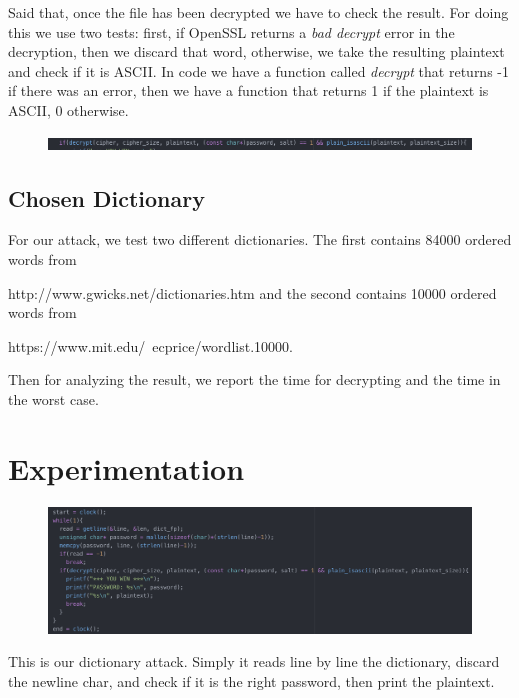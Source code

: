 \documentclass[11pt]{article}
\begin{document}
Said that, once the file has been decrypted we have to check the result. For doing this we use two tests: first, if OpenSSL returns a {\em bad decrypt} error in the decryption, then we discard that word, otherwise, we take the resulting plaintext and check if it is ASCII. In code we have a function called {\em decrypt} that returns -1 if there was an error, then we have a function that returns 1 if the plaintext is ASCII, 0 otherwise.

\begin{figure}[!ht]
 \includegraphics[width=1\textwidth]{pic3-hw2-1635747}
 \label{fig:Ascii check}
\end{figure}

\subsection{Chosen Dictionary}
For our attack, we test two different dictionaries. The first contains 84000 ordered words from

http://www.gwicks.net/dictionaries.htm \newline and the second contains 10000 ordered words from

https://www.mit.edu/~ecprice/wordlist.10000.

Then for analyzing the result, we report the time for decrypting and the time in the worst case.

\section{Experimentation}
\begin{figure}[!ht]
 \includegraphics[width=1\textwidth]{pic4-hw2-1635747}
 \label{fig:Dictionary attack}
\end{figure}

This is our dictionary attack. Simply it reads line by line the dictionary, discard the newline char, and check if it is the right password, then print the plaintext.
\end{document}
